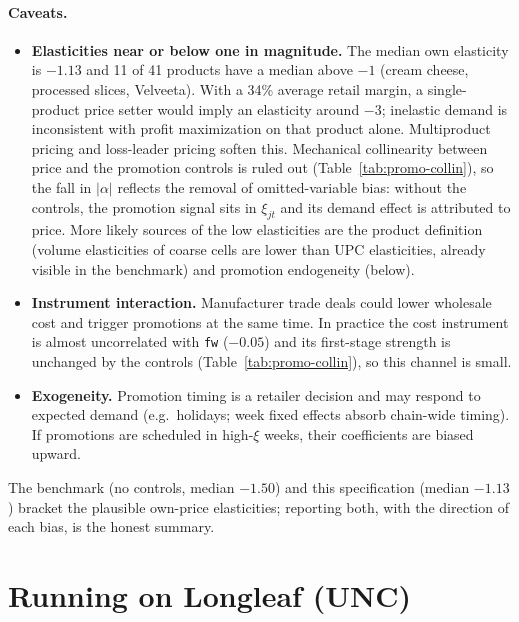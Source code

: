 \documentclass[11pt]{article}
\newcommand{\code}[1]{\texttt{#1}}
\begin{document}
\paragraph{Caveats.}
\begin{itemize}
  \item \textbf{Elasticities near or below one in magnitude.} The median own elasticity is
        $-1.13$ and 11 of 41 products have a median above $-1$ (cream cheese, processed
        slices, Velveeta). With a 34\% average retail margin, a single-product price setter
        would imply an elasticity around $-3$; inelastic demand is inconsistent with profit
        maximization on that product alone. Multiproduct pricing and loss-leader pricing
        soften this. Mechanical collinearity between price and the promotion controls is ruled
        out (Table~\ref{tab:promo-collin}), so the fall in $|\alpha|$ reflects the removal of
        omitted-variable bias: without the controls, the promotion signal sits in $\xi_{jt}$
        and its demand effect is attributed to price. More likely sources of the low
        elasticities are the product definition (volume elasticities of coarse cells are lower
        than UPC elasticities, already visible in the benchmark) and promotion endogeneity
        (below).
  \item \textbf{Instrument interaction.} Manufacturer trade deals could lower wholesale cost
        and trigger promotions at the same time. In practice the cost instrument is almost
        uncorrelated with \code{fw} ($-0.05$) and its first-stage strength is unchanged by the
        controls (Table~\ref{tab:promo-collin}), so this channel is small.
  \item \textbf{Exogeneity.} Promotion timing is a retailer decision and may respond to
        expected demand (e.g.\ holidays; week fixed effects absorb chain-wide timing). If
        promotions are scheduled in high-$\xi$ weeks, their coefficients are biased upward.
\end{itemize}

The benchmark (no controls, median $-1.50$) and this specification (median $-1.13$) bracket
the plausible own-price elasticities; reporting both, with the direction of each bias, is the
honest summary.

\section{Running on Longleaf (UNC)}\label{sec:longleaf}
\end{document}
